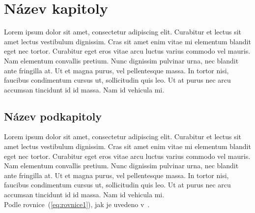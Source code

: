 
\chapter{Název kapitoly}
Lorem ipsum dolor sit amet, consectetur adipiscing elit. Curabitur et lectus sit amet lectus vestibulum dignissim. Cras sit amet enim vitae mi elementum blandit eget nec tortor. Curabitur eget eros vitae arcu luctus varius commodo vel mauris. Nam elementum convallis pretium. Nunc dignissim pulvinar urna, nec blandit ante fringilla at. Ut et magna purus, vel pellentesque massa. In tortor nisi, faucibus condimentum cursus ut, sollicitudin quis leo. Ut at purus nec arcu accumsan tincidunt id id massa. Nam id vehicula mi. 

\section{Název podkapitoly}
Lorem ipsum dolor sit amet, consectetur adipiscing elit. Curabitur et lectus sit amet lectus vestibulum dignissim. Cras sit amet enim vitae mi elementum blandit eget nec tortor. Curabitur eget eros vitae arcu luctus varius commodo vel mauris. Nam elementum convallis pretium. Nunc dignissim pulvinar urna, nec blandit ante fringilla at. Ut et magna purus, vel pellentesque massa. In tortor nisi, faucibus condimentum cursus ut, sollicitudin quis leo. Ut at purus nec arcu accumsan tincidunt id id massa. Nam id vehicula mi. 
\begin{equation}
  \label{eq:rovnice1}
\end{equation}
Podle rovnice~(\ref{eq:rovnice1}), jak je uvedeno v~\cite{gravitation}. 

